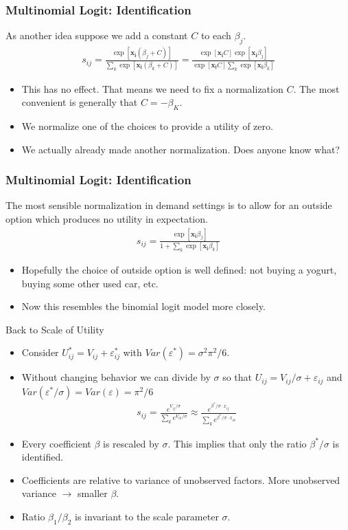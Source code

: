 \documentclass[xcolor=pdftex,dvipsnames,table,mathserif]{beamer}
\begin{document}
\begin{frame}
\frametitle{Multinomial Logit: Identification}
As another idea suppose we add a constant $C$ to each $\beta_j$.
\begin{eqnarray*}
s_{ij} = \frac{\exp[\mathbf{x_i} (\beta_j+C) ]}{\sum_k \exp[\mathbf{x_i} (\beta_k+C) ]} =  \frac{\exp[\mathbf{x_i} C] \exp[\mathbf{x_i} \beta_j ]}{\exp[\mathbf{x_i} C] \sum_k \exp[\mathbf{x_i} \beta_k ]} 
\end{eqnarray*}
\begin{itemize}
\item This has no effect.  That means we need to fix a normalization $C$. The most convenient is generally that $C = - \beta_K$. \
\item We normalize one of the choices to provide a utility of zero.
\item We actually already made another normalization. Does anyone know what?
\end{itemize}
\end{frame}


\begin{frame}
\frametitle{Multinomial Logit: Identification}
The most sensible normalization in demand settings is to allow for an \alert{outside option} which produces no utility in expectation.
\begin{eqnarray*}
s_{ij} = \frac{\exp[\mathbf{x_i}\beta_j ]}{1+\sum_k \exp[\mathbf{x_i} \beta_k ]} 
\end{eqnarray*}
\begin{itemize}
\item Hopefully the choice of outside option is well defined: not buying a yogurt, buying some other used car, etc.
\item Now this resembles the binomial logit model more closely.
\end{itemize}
\end{frame}


\begin{frame}{Back to Scale of Utility}
\begin{itemize}
\item Consider $U_{ij}^{*} = V_{ij} + \varepsilon_{ij}^{*}$ with $Var(\varepsilon^{*}) = \sigma^2 \pi^2/6$.
\item Without changing behavior we can divide by $\sigma$ so that $U_{ij} = V_{ij}/\sigma + \varepsilon_{ij}$ and $Var(\varepsilon^{*}/\sigma)=Var(\varepsilon) = \pi^2/6$
\begin{eqnarray*}
s_{ij} = \frac{e^{V_{ij}/\sigma}}{\sum_k e^{V_{ik}/\sigma}} \approx \frac{e^{\beta^{*}/\sigma \cdot x_{ij}}}{\sum_k e^{\beta^{*}/\sigma \cdot x_{ik}}}
\end{eqnarray*}
\item Every coefficient $\beta$ is rescaled by $\sigma$. This implies that only the ratio $\beta^{*}/\sigma$ is identified. 
\item Coefficients are relative to variance of unobserved factors. More unobserved variance $\longrightarrow$ smaller $\beta$.
\item Ratio $\beta_1/\beta_2$ is invariant to the scale parameter $\sigma$.
\end{itemize}
\end{frame}
\end{document}
